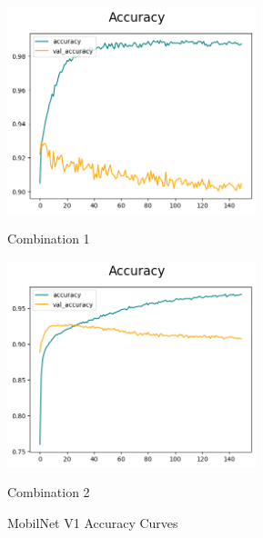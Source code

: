 \begin{figure}[H]
    \centering
    \begin{minipage}[b]{0.49\textwidth}
        \centering
        \includegraphics[width=\textwidth, height=6cm]{Figures/balanced_data/more_data/withoutbn/mn1/accuracy.png}
        \captionsetup{labelformat=empty}
        \caption{Combination 1}
        \label{fig:u_wo_r_a}
    \end{minipage}
    \hfill
    \begin{minipage}[b]{0.49\textwidth}
        \centering
        \includegraphics[width=\textwidth, height=6cm]{Figures/balanced_data/more_data/withbn/mn1/accuracy.png}
        \captionsetup{labelformat=empty}
        \caption{Combination 2}
        \label{fig:u_w_r_a}
    \end{minipage}
    \captionsetup{labelformat=default}
    \caption{MobilNet V1 Accuracy Curves}
\end{figure}


